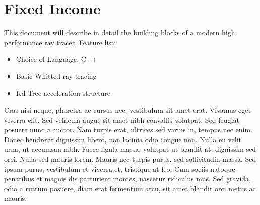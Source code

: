 \chapter{Fixed Income}
This document will describe in detail the building blocks of a modern high performance ray tracer.
Feature list:
\begin{itemize}
\item Choice of Language, C++
\item Basic Whitted ray-tracing
\item Kd-Tree acceleration structure
\end{itemize}
Cras nisi neque, pharetra ac cursus nec, vestibulum sit amet erat. Vivamus eget viverra elit. Sed vehicula augue sit amet nibh convallis volutpat. Sed feugiat posuere nunc a auctor. Nam turpis erat, ultrices sed varius in, tempus nec enim. Donec hendrerit dignissim libero, non lacinia odio congue non. Nulla eu velit urna, ut accumsan nibh. Fusce ligula massa, volutpat ut blandit at, dignissim sed orci. Nulla sed mauris lorem. Mauris nec turpis purus, sed sollicitudin massa. Sed ipsum purus, vestibulum et viverra et, tristique at leo. Cum sociis natoque penatibus et magnis dis parturient montes, nascetur ridiculus mus. Sed gravida, odio a rutrum posuere, diam erat fermentum arcu, sit amet blandit orci metus ac mauris.
